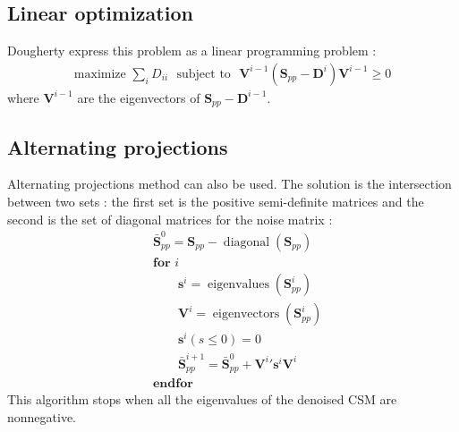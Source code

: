 \documentclass[fontsize=12pt,DIV13,paper=a4,abstract=true,titlepage=false]{scrartcl}
\newcommand{\bo}[1]{ \mathbf{#1} }
\begin{document}
\subsection{Linear optimization}
Dougherty express this problem as a linear programming problem :
\begin{equation}
	\begin{aligned}
        		\text{maximize~} \sum_i D_{ii} \text{~~subject to~~}  \bo{V}^{i-1} \left( \bo{S}_{pp}-\bo{D}^i \right) \bo{V}^{i-1} \geq 0 
	\end{aligned}
\end{equation}
where $\bo{V}^{i-1}$ are the eigenvectors of $\bo{S}_{pp}-\bo{D}^{i-1} $.
 
 \subsection{Alternating projections}
Alternating projections method can also be used. The solution is the intersection between two sets : the first set is the positive semi-definite matrices and the second is the set of diagonal matrices for the noise matrix : 
\begin{equation}
	\begin{aligned}
		    &\bar{\bo{S}}_{pp}^0 = \bo{S}_{pp}-\operatorname{diagonal}(\bo{S}_{pp})\\
		    &\textbf{for~} i\\
		    & \qquad  \bo{s}^i = \operatorname{eigenvalues}(\bo{S}_{pp}^i)\\
		    & \qquad \bo{V}^i = \operatorname{eigenvectors}(\bo{S}_{pp}^i)\\
		   & \qquad \bo{s}^i(s \leq 0) = 0\\
		   & \qquad \bar{\bo{S}}_{pp}^{i+1} = \bar{\bo{S}}_{pp}^0 + \bo{V}^{i}{'}\bo{s}^i\bo{V}^i \\
		   &\textbf{endfor}
	\end{aligned}
\end{equation}
This algorithm stops when all the eigenvalues of the denoised CSM are nonnegative.
\end{document}

